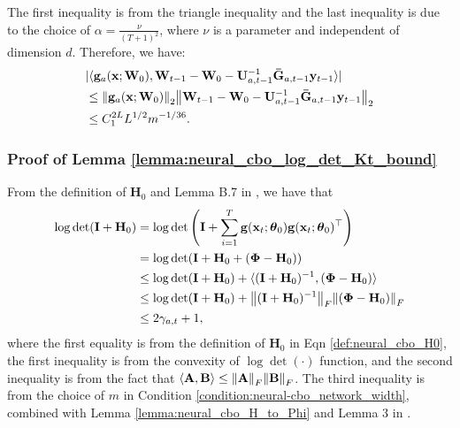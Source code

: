 The first inequality is from the triangle inequality and the last inequality is due to the choice of $\alpha = \frac{\nu}{(T+1)^2}$, where $\nu$ is a parameter and independent of
dimension $d$. 
Therefore, we have:
\begin{align*}
    & \lvert \langle \mathbf{g}_a(\mathbf{x};\mathbf{W}_0), \mathbf{W}_{t-1} - \mathbf{W}_0 - \mathbf{U}_{a,t-1}^{-1} \mathbf{\Bar{G}}_{a,t-1} \mathbf{y}_{t-1} \rangle \rvert 
    \\
    & \le \norm{\mathbf{g}_a(\mathbf{x};\mathbf{W}_0)}_2 \norm{\mathbf{W}_{t-1} - \mathbf{W}_0 - \mathbf{U}_{a,t-1}^{-1} \mathbf{\Bar{G}}_{a,t-1} \mathbf{y}_{t-1}}_2 
    \\
    & \le C_1^{2L} L^{1/2} m^{-1/36}.
\end{align*}

\subsubsection{Proof of Lemma \ref{lemma:neural_cbo_log_det_Kt_bound}}

From the definition of $\mathbf{H}_0$ and Lemma B.7 in \citet{zhou2020neural}, we have that
\begin{equation*}
\begin{split}
    \log \det(\mathbf{I}+ \mathbf{H}_{0})
    & = \log\det \left(\mathbf{I}+\sum_{i=1}^{T}\mathbf{g}({\mathbf{x}_t};\boldsymbol{\theta}_0)\mathbf{g}({\mathbf{x}_t};\boldsymbol{\theta}_0)^\top \right) \\
    & = \log \det(\mathbf{I}+ \mathbf{H}_0 + (\boldsymbol{\Phi} - \mathbf{H}_0))\\
    & \leq \log \det (\mathbf{I}+\mathbf{H}_0)  + \langle (\mathbf{I}+\mathbf{H}_0)^{-1}, (\boldsymbol{\Phi} - \mathbf{H}_0) \rangle \\
    & \leq \log \det (\mathbf{I}+\mathbf{H}_0)  + \norm{(\mathbf{I}+\mathbf{H}_0)^{-1}}_F \norm{ (\boldsymbol{\Phi} - \mathbf{H}_0)}_F \\
    & \leq 2 \gamma_{a,t} + 1, 
\end{split}
\end{equation*}
where the first equality is from the definition of $\mathbf{H}_0$ in Eqn \eqref{def:neural_cbo_H0}, the first inequality is from the convexity of $\log \det(\cdot)$ function, and the second inequality is from the fact that $\langle \mathbf{A}, \mathbf{B} \rangle \le \norm{\mathbf{A}}_F \norm{\mathbf{B}}_F$. The third inequality is from the choice of $m$ in Condition \ref{condition:neural-cbo_network_width}, combined with Lemma \ref{lemma:neural_cbo_H_to_Phi} and Lemma 3 in \citet{chowdhury2017kernelized}.
